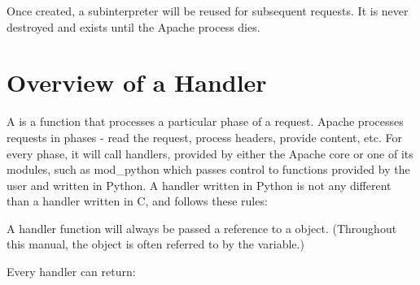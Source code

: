 Once created, a subinterpreter will be reused for subsequent requests.
It is never destroyed and exists until the Apache process dies.

\begin{seealso}
\end{seealso}

\section{Overview of a Handler\label{pyapi-handler}}

A  is a function that processes a particular phase of a
request. Apache processes requests in phases - read the request,
process headers, provide content, etc. For every phase, it will call
handlers, provided by either the Apache core or one of its modules,
such as mod_python which passes control to functions provided by the
user and written in Python. A handler written in Python is not any
different than a handler written in C, and follows these rules:

A handler function will always be passed a reference to a
 object. (Throughout this manual, the 
object is often referred to by the  variable.)

Every handler can return:

